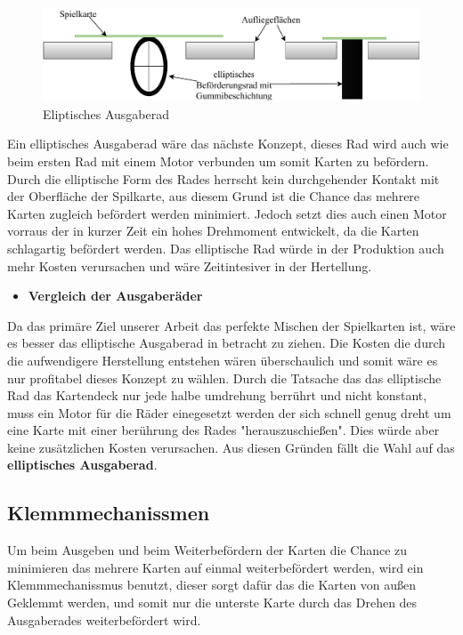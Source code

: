 \begin{figure}[H]
    \centering
    \includegraphics[scale=0.5,page=1]{fig/mech/ElliptischesAusgaberad}
    \caption{Eliptisches Ausgaberad}
\end{figure}


        Ein elliptisches Ausgaberad wäre das nächste Konzept, dieses Rad wird auch wie beim ersten Rad mit einem Motor verbunden um somit Karten zu befördern.
        Durch die elliptische Form des Rades herrscht kein durchgehender Kontakt mit der Oberfläche der Spilkarte, aus diesem Grund ist die Chance das mehrere
        Karten zugleich befördert werden minimiert. Jedoch setzt dies auch einen Motor vorraus der in kurzer Zeit ein hohes Drehmoment entwickelt, da die
        Karten schlagartig befördert werden. Das elliptische Rad würde in der Produktion auch mehr Kosten verursachen und wäre Zeitintesiver in der Hertellung. \\

\begin{itemize}
    \item \textbf{Vergleich der Ausgaberäder}
\end{itemize}

Da das primäre Ziel unserer Arbeit das perfekte Mischen der Spielkarten ist, wäre es besser das elliptische Ausgaberad in betracht zu ziehen. Die Kosten
 die durch die aufwendigere Herstellung entstehen wären überschaulich und somit wäre es nur profitabel dieses Konzept zu wählen. Durch die Tatsache das das elliptische Rad
das Kartendeck nur jede halbe umdrehung berrührt und nicht konstant, muss ein Motor für die Räder einegesetzt werden der sich schnell genug dreht um eine Karte mit einer berührung
des Rades "herauszuschießen". Dies würde aber keine zusätzlichen Kosten verursachen. Aus diesen Gründen fällt die Wahl auf das \textbf{elliptisches Ausgaberad}. \\

\subsection{Klemmmechanissmen}
Um beim Ausgeben und beim Weiterbefördern der Karten die Chance zu minimieren das mehrere Karten auf einmal weiterbefördert werden, wird ein
Klemmmechanissmus benutzt, dieser sorgt dafür das die Karten von außen Geklemmt werden, und somit nur die unterste Karte durch das Drehen des
Ausgaberades weiterbefördert wird.

